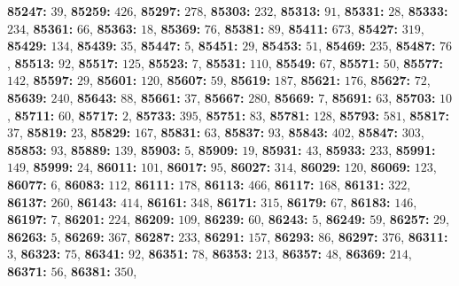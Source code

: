 \textsf{\bfseries 85247:} $39$, \textsf{\bfseries 85259:} $426$, \textsf{\bfseries 85297:} $278$, \textsf{\bfseries 85303:} $232$, \textsf{\bfseries 85313:} $91$, \textsf{\bfseries 85331:} $28$, \textsf{\bfseries 85333:} $234$, \textsf{\bfseries 85361:} $66$, \textsf{\bfseries 85363:} $18$, \textsf{\bfseries 85369:} $76$, \textsf{\bfseries 85381:} $89$, \textsf{\bfseries 85411:} $673$, \textsf{\bfseries 85427:} $319$, \textsf{\bfseries 85429:} $134$, \textsf{\bfseries 85439:} $35$, \textsf{\bfseries 85447:} $5$, \textsf{\bfseries 85451:} $29$, \textsf{\bfseries 85453:} $51$, \textsf{\bfseries 85469:} $235$, \textsf{\bfseries 85487:} $76$, \textsf{\bfseries 85513:} $92$, \textsf{\bfseries 85517:} $125$, \textsf{\bfseries 85523:} $7$, \textsf{\bfseries 85531:} $110$, \textsf{\bfseries 85549:} $67$, \textsf{\bfseries 85571:} $50$, \textsf{\bfseries 85577:} $142$, \textsf{\bfseries 85597:} $29$, \textsf{\bfseries 85601:} $120$, \textsf{\bfseries 85607:} $59$, \textsf{\bfseries 85619:} $187$, \textsf{\bfseries 85621:} $176$, \textsf{\bfseries 85627:} $72$, \textsf{\bfseries 85639:} $240$, \textsf{\bfseries 85643:} $88$, \textsf{\bfseries 85661:} $37$, \textsf{\bfseries 85667:} $280$, \textsf{\bfseries 85669:} $7$, \textsf{\bfseries 85691:} $63$, \textsf{\bfseries 85703:} $10$, \textsf{\bfseries 85711:} $60$, \textsf{\bfseries 85717:} $2$, \textsf{\bfseries 85733:} $395$, \textsf{\bfseries 85751:} $83$, \textsf{\bfseries 85781:} $128$, \textsf{\bfseries 85793:} $581$, \textsf{\bfseries 85817:} $37$, \textsf{\bfseries 85819:} $23$, \textsf{\bfseries 85829:} $167$, \textsf{\bfseries 85831:} $63$, \textsf{\bfseries 85837:} $93$, \textsf{\bfseries 85843:} $402$, \textsf{\bfseries 85847:} $303$, \textsf{\bfseries 85853:} $93$, \textsf{\bfseries 85889:} $139$, \textsf{\bfseries 85903:} $5$, \textsf{\bfseries 85909:} $19$, \textsf{\bfseries 85931:} $43$, \textsf{\bfseries 85933:} $233$, \textsf{\bfseries 85991:} $149$, \textsf{\bfseries 85999:} $24$, \textsf{\bfseries 86011:} $101$, \textsf{\bfseries 86017:} $95$, \textsf{\bfseries 86027:} $314$, \textsf{\bfseries 86029:} $120$, \textsf{\bfseries 86069:} $123$, \textsf{\bfseries 86077:} $6$, \textsf{\bfseries 86083:} $112$, \textsf{\bfseries 86111:} $178$, \textsf{\bfseries 86113:} $466$, \textsf{\bfseries 86117:} $168$, \textsf{\bfseries 86131:} $322$, \textsf{\bfseries 86137:} $260$, \textsf{\bfseries 86143:} $414$, \textsf{\bfseries 86161:} $348$, \textsf{\bfseries 86171:} $315$, \textsf{\bfseries 86179:} $67$, \textsf{\bfseries 86183:} $146$, \textsf{\bfseries 86197:} $7$, \textsf{\bfseries 86201:} $224$, \textsf{\bfseries 86209:} $109$, \textsf{\bfseries 86239:} $60$, \textsf{\bfseries 86243:} $5$, \textsf{\bfseries 86249:} $59$, \textsf{\bfseries 86257:} $29$, \textsf{\bfseries 86263:} $5$, \textsf{\bfseries 86269:} $367$, \textsf{\bfseries 86287:} $233$, \textsf{\bfseries 86291:} $157$, \textsf{\bfseries 86293:} $86$, \textsf{\bfseries 86297:} $376$, \textsf{\bfseries 86311:} $3$, \textsf{\bfseries 86323:} $75$, \textsf{\bfseries 86341:} $92$, \textsf{\bfseries 86351:} $78$, \textsf{\bfseries 86353:} $213$, \textsf{\bfseries 86357:} $48$, \textsf{\bfseries 86369:} $214$, \textsf{\bfseries 86371:} $56$, \textsf{\bfseries 86381:} $350$, 
